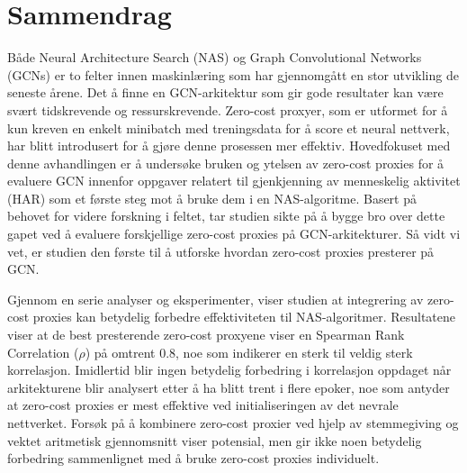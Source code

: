 \chapter*{Sammendrag}

Både Neural Architecture Search (NAS) og Graph Convolutional Networks (GCNs) er to felter innen maskinlæring som har gjennomgått en stor utvikling de seneste årene. Det å finne en GCN-arkitektur som gir gode resultater kan være svært tidskrevende og ressurskrevende. Zero-cost proxyer, som er utformet for å kun kreven en enkelt minibatch med treningsdata for å score et neural nettverk, har blitt introdusert for å gjøre denne prosessen mer effektiv. Hovedfokuset med denne avhandlingen er å undersøke bruken og ytelsen av zero-cost proxies for å evaluere GCN innenfor oppgaver relatert til gjenkjenning av menneskelig aktivitet (HAR) som et første steg mot å bruke dem i en NAS-algoritme. Basert på behovet for videre forskning i feltet, tar studien sikte på å bygge bro over dette gapet ved å evaluere forskjellige zero-cost proxies på GCN-arkitekturer. Så vidt vi vet, er studien den første til å utforske hvordan zero-cost proxies presterer på GCN. 

Gjennom en serie analyser og eksperimenter, viser studien at integrering av zero-cost proxies kan betydelig forbedre effektiviteten til NAS-algoritmer. Resultatene viser at de best presterende zero-cost proxyene viser en Spearman Rank Correlation ($\rho$) på omtrent $0.8$, noe som indikerer en sterk til veldig sterk korrelasjon. Imidlertid blir ingen betydelig forbedring i korrelasjon oppdaget når arkitekturene blir analysert etter å ha blitt trent i flere epoker, noe som antyder at zero-cost proxies er mest effektive ved initialiseringen av det nevrale nettverket. Forsøk på å kombinere zero-cost proxier ved hjelp av stemmegiving og vektet aritmetisk gjennomsnitt viser potensial, men gir ikke noen betydelig forbedring sammenlignet med å bruke zero-cost proxies individuelt. 





